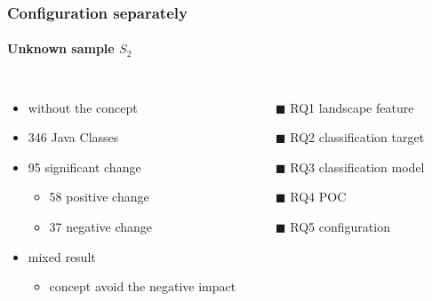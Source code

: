 \begin{frame}
	\frametitle{Configuration separately}
	\framesubtitle{Unknown sample $S_2$}

	\begin{columns}[c]
	
	\begin{itemize}
		\item without the concept
		\item 346 Java Classes
		\item 95 significant change
		\begin{itemize}
			\item 58 positive change
			\item 37 negative change
		\end{itemize}
		\item mixed result
		\begin{itemize}
			\item concept avoid the negative impact
		\end{itemize}
	\end{itemize}
	
		\begin{itemize}
			\item[\textcolor{hni-gray}{$\blacksquare$}] \textcolor{hni-gray}{RQ1 landscape feature}
			\item[\textcolor{hni-gray}{$\blacksquare$}] \textcolor{hni-gray}{RQ2 classification target}
			\item[$\blacksquare$] RQ3 classification model \checkmark
			\item[\textcolor{hni-gray}{$\blacksquare$}] \textcolor{hni-gray}{RQ4 POC}
			\item[$\blacksquare$] RQ5 configuration \xmark
		\end{itemize}
	
	\end{columns}
	
\end{frame}